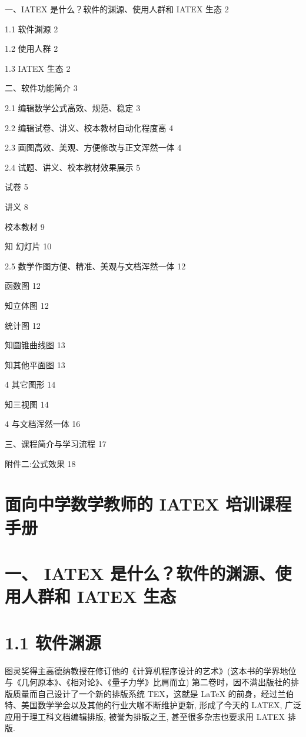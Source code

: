 \documentclass[10pt]{article}
\begin{document}
一、IATEX 是什么？软件的渊源、使用人群和 IATEX 生态 2

1.1 软件渊源 2

1.2 使用人群 2

1.3 IATEX 生态 2

二、软件功能简介 3

2.1 编辑数学公式高效、规范、稳定 3

2.2 编辑试卷、讲义、校本教材自动化程度高 4

2.3 画图高效、美观、方便修改与正文浑然一体 4

2.4 试题、讲义、校本教材效果展示 5

试卷 5

讲义 8

校本教材 9

知 幻灯片 10

2.5 数学作图方便、精准、美观与文档浑然一体 12

函数图 12

知立体图 12

统计图 12

知圆锥曲线图 13

知其他平面图 13

4 其它图形 14

知三视图 14

4 与文档浑然一体 16

三、课程简介与学习流程 17

附件二:公式效果 18

\section*{面向中学数学教师的 IATEX 培训课程手册}

\section*{一、 IATEX 是什么？软件的渊源、使用人群和 IATEX 生态}

\section*{1.1 软件渊源}

图灵奖得主高德纳教授在修订他的《计算机程序设计的艺术》(这本书的学界地位与《几何原本》、《相对论》、《量子力学》比肩而立) 第二卷时，因不满出版社的排版质量而自己设计了一个新的排版系统 TEX，这就是 LaTeX 的前身，经过兰伯特、美国数学学会以及其他的行业大咖不断维护更新, 形成了今天的 LATEX, 广泛应用于理工科文档编辑排版, 被誉为排版之王, 甚至很多杂志也要求用 LATEX 排版.
\end{document}
